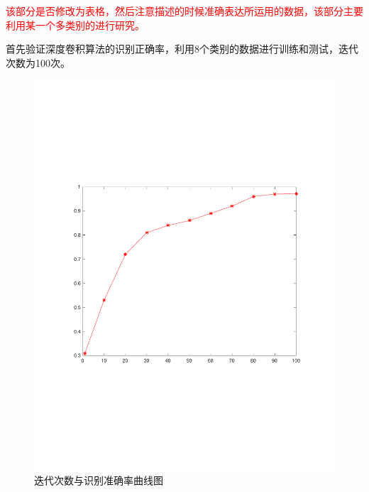 \textcolor{red}{该部分是否修改为表格，然后注意描述的时候准确表达所运用的数据，该部分主要利用某一个多类别的进行研究。}

首先验证深度卷积算法的识别正确率，利用8个类别的数据进行训练和测试，迭代次数为100次。
\begin{figure}
	\centering
	\includegraphics[width=\textwidth]{figures/emitter/diff_epoch}
	\caption{迭代次数与识别准确率曲线图}
	\label{fig:openset_epoch}
\end{figure}

